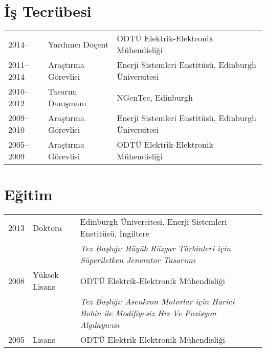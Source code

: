 \documentclass[a4paper,12pt]{article}
\begin{document}
\maketitle

\section{İş Tecrübesi}

\begin{tabular}{lp{3.6cm}l}
2014-- & Yardımcı Doçent & ODTÜ Elektrik-Elektronik Mühendisliği \\
2011--2014 & Araştırma Görevlisi & Enerji Sistemleri Enstitüsü, Edinburgh Üniversitesi \\ 
2010--2012 & Tasarım Danışmanı & NGenTec, Edinburgh\\
2009--2010 & Araştırma Görevlisi & Enerji Sistemleri Enstitüsü, Edinburgh Üniversitesi \\ 
2005--2009 & Araştırma Görevlisi & ODTÜ Elektrik-Elektronik Mühendisliği \\
\end{tabular}
 
\section{Eğitim}
\begin{tabular}{llp{12cm}}
2013 & Doktora & Edinburgh  Üniversitesi, Enerji Sistemleri Enstitüsü, İngiltere\\  
& & \textit{Tez Başlığı: Büyük Rüzgar Türbinleri için Süperiletken Jenerator Tasarımı} \\ 
2008 & Yüksek Lisans & ODTÜ Elektrik-Elektronik Mühendisliği\\
& & \textit{Tez Başlığı: Asenkron Motorlar için Harici Bobin ile Modifiyesiz Hız Ve Pozisyon Algılayıcısı}\\
2005 & Lisans & ODTÜ Elektrik-Elektronik Mühendisliği \\

\end{tabular}



\end{document}
